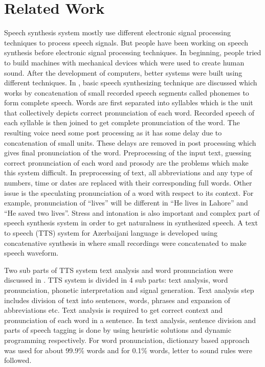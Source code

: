 \chapter{Related Work}

Speech synthesis system mostly use different electronic signal processing techniques to process speech signals. But people have been working on speech synthesis before electronic signal processing techniques. In beginning, people tried to build machines with mechanical devices which were used to create human sound. After the development of computers, better systems were built using different techniques. In \cite{swetha2013text}, basic speech synthesizing technique are discussed which works by concatenation of small recorded speech segments called phonemes to form complete speech. Words are first separated into syllables which is the unit that collectively depicts correct pronunciation of each word. Recorded speech of each syllable is then joined to get complete pronunciation of the word. The resulting voice need some post processing as it has some delay due to concatenation of small units. These delays are removed in post processing which gives final pronunciation of the word. Preprocessing of the input text, guessing correct pronunciation of each word and prosody are the problems which make this system difficult. In preprocessing of text, all abbreviations and any type of numbers, time or dates are replaced with their corresponding full words. Other issue is the speculating pronunciation of a word with respect to its context. For example, pronunciation of “lives” will be different in “He lives in Lahore” and “He saved two lives”. Stress and intonation is also important and complex part of speech synthesis system in order to get naturalness in synthesized speech. A text to speech (TTS) system for Azerbaijani language is developed using concatenative synthesis in \cite{aida2010main} where small recordings were concatenated to make speech waveform.

Two sub parts of TTS system text analysis and word pronunciation were discussed in \cite{liberman1992text}. TTS system is divided in 4 sub parts: text analysis, word pronunciation, phonetic interpretation and signal generation. Text analysis step includes division of text into sentences, words, phrases and expansion of abbreviations etc. Text analysis is required to get correct context and pronunciation of each word in a sentence. In text analysis, sentence division and parts of speech tagging is done by using heuristic solutions \cite{riley1989some} and dynamic programming respectively. For word pronunciation, dictionary based approach was used for about 99.9\% words and for 0.1\% words, letter to sound rules were followed. 

